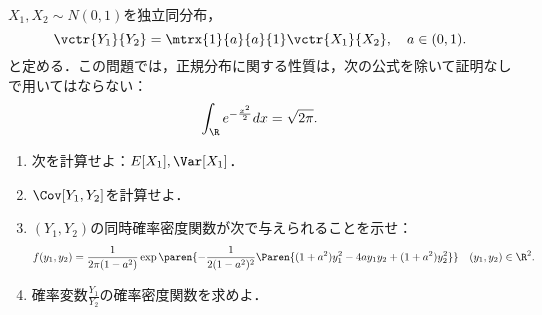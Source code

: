 \documentclass[uplatex,dvipdfmx]{jsarticle}
\begin{document}
\begin{tcolorbox}[colframe=ForestGreen, colback=ForestGreen!10!white,breakable,colbacktitle=ForestGreen!40!white,coltitle=black,fonttitle=\bfseries\sffamily,
    title=第４問]
    \begin{problem}\label{prob-19-1-4}
        $X_1,X_2\sim N(0,1)$を独立同分布，
        \[\vctr{Y_1}{Y_2}=\mtrx{1}{a}{a}{1}\vctr{X_1}{X_2},\quad a\in(0,1).\]
        と定める．この問題では，正規分布に関する性質は，次の公式を除いて証明なしで用いてはならない：
        \[\int_\R e^{-\frac{x^2}{2}}dx=\sqrt{2\pi}.\]
        \begin{enumerate}
            \item 次を計算せよ：$E[X_1],\Var[X_1]$．
            \item $\Cov[Y_1,Y_2]$を計算せよ．
            \item $(Y_1,Y_2)$の同時確率密度関数が次で与えられることを示せ：
            \[f(y_1,y_2)=\frac{1}{2\pi(1-a^2)}\exp\paren{-\frac{1}{2(1-a^2)^2}\Paren{(1+a^2)y_1^2-4ay_1y_2+(1+a^2)y^2_2}}\quad(y_1,y_2)\in\R^2.\]
            \item 確率変数$\frac{Y_1}{Y_2}$の確率密度関数を求めよ．
        \end{enumerate}
    \end{problem}
\end{tcolorbox}
\end{document}
